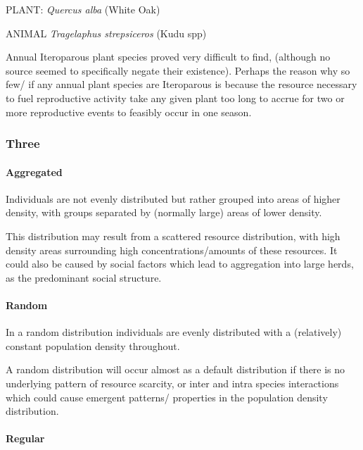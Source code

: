 \documentclass[]{article}
\let\oldparagraph\paragraph
\renewcommand{\paragraph}[1]{\oldparagraph{#1}\mbox{}}
\begin{document}
PLANT: \emph{Quercus alba} (White Oak)

ANIMAL \emph{Tragelaphus strepsiceros} (Kudu spp)

Annual Iteroparous plant species proved very difficult to find,
(although no source seemed to specifically negate their existence).
Perhaps the reason why so few/ if any annual plant species are
Iteroparous is because the resource necessary to fuel reproductive
activity take any given plant too long to accrue for two or more
reproductive events to feasibly occur in one season.

\hypertarget{three}{%
\subsubsection{Three}\label{three}}

\hypertarget{aggregated}{%
\paragraph{Aggregated}\label{aggregated}}

Individuals are not evenly distributed but rather grouped into areas of
higher density, with groups separated by (normally large) areas of lower
density.

This distribution may result from a scattered resource distribution,
with high density areas surrounding high concentrations/amounts of these
resources. It could also be caused by social factors which lead to
aggregation into large herds, as the predominant social structure.

\hypertarget{random}{%
\paragraph{Random}\label{random}}

In a random distribution individuals are evenly distributed with a
(relatively) constant population density throughout.

A random distribution will occur almost as a default distribution if
there is no underlying pattern of resource scarcity, or inter and intra
species interactions which could cause emergent patterns/ properties in
the population density distribution.

\hypertarget{regular}{%
\paragraph{Regular}\label{regular}}
\end{document}
